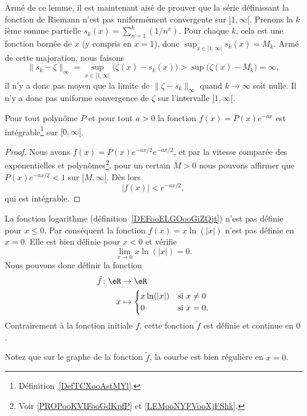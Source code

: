 	Armé de ce lemme, il est maintenant aisé de prouver que la série définissant la fonction de Riemann n'est pas uniformément convergente sur \( ]1,\infty[\). Prenons la \( k\)ième somme partielle \( s_k(x)=\sum_{n=1}^k(1/n^x)\). Pour chaque \( k\), cela est une fonction bornée de \( x\) (y compris en \( x=1\)), donc \( \sup_{x\in]1,\infty[}s_k(x)=M_k\). Armé de cette majoration, nous faisons
\begin{equation}
	\| s_k-\zeta \|_{\infty}=\sup_{x\in]1,\infty[}\big( \zeta(x)-s_k(x) \big)>\sup\big( \zeta(x)-M_k \big)=\infty,
\end{equation}
il n'y a donc pas moyen que la limite de \( \| \zeta-s_k \|_{\infty}\) quand \( k\to\infty\) soit nulle. Il n'y a donc pas uniforme convergence de \( \zeta\) sur l'intervalle \( ]1,\infty[\).

\begin{proposition} \label{PropBQGBooHxNrrf}
	Pour tout polynôme \( P\) et pour tout \( a>0\) la fonction \( f(x)=P(x) e^{-ax}\) est intégrable\footnote{Définition~\ref{DefTCXooAstMYl}.} sur \( \mathopen[ 0 , \infty [\).
\end{proposition}

\begin{proof}
    Nous avons \( f(x)=P(x) e^{-ax/2} e^{-ax/2}\), et par la vitesse comparée des exponentielles et polynômes\footnote{Voir \ref{PROPooKVIFooGdKpfP} et \ref{LEMooNYFVooXjFShk}.}, pour un certain \( M>0\) nous pouvons affirmer que \( P(x) e^{-ax/2}<1\) sur \( \mathopen[ M , \infty [\). Dès lors
	\begin{equation}
		| f(x) |< e^{-ax/2},
	\end{equation}
	qui est intégrable.
\end{proof}

\begin{example}     \label{EXooAGEOooQdQkrS}
	La fonction logarithme (définition~\ref{DEFooELGOooGiZQjt}) n'est pas définie pour \( x\leq 0\). Par conséquent la fonction \( f(x)=x\ln(|x|)\) n'est pas définie en \( x=0\). Elle est bien définie pour \( x<0\) et vérifie
	\begin{equation}
		\lim_{x\to 0} x\ln(|x|)=0.
	\end{equation}
	Nous pouvons donc définir la fonction
	\begin{equation}
		\begin{aligned}
			\tilde f\colon \eR & \to \eR                             \\
			x                  & \mapsto \begin{cases}
				x\ln(| x |) & \text{si } x\neq 0 \\
				0           & \text{si } x=0.
			\end{cases}
		\end{aligned}
	\end{equation}
	Contrairement à la fonction initiale \( f\), cette fonction \( \tilde f\) est définie et continue en \( 0\).

	Notez que sur le graphe de la fonction \( \tilde f\), la courbe est bien régulière en \( x=0\).
	\begin{center}
		
	\end{center}
\end{example}


